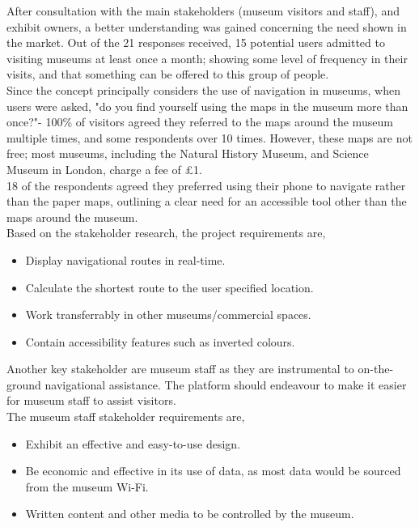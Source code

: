 
After consultation with the main stakeholders (museum visitors and staff), and exhibit owners, a better understanding was gained concerning the need shown in the market. Out of the 21 responses received, 15 potential users admitted to visiting museums at least once a month; showing some level of frequency in their visits, and that something can be offered to this group of people.\\

Since the concept principally considers the use of navigation in museums, when users were asked, "do you find yourself using the maps in the museum more than once?"- 100\% of visitors agreed they referred to the maps around the museum multiple times, and some respondents over 10 times. However, these maps are not free; most museums, including the Natural History Museum, and Science Museum in London, charge a fee of £1.\\

18 of the respondents agreed they preferred using their phone to navigate rather than the paper maps, outlining a clear need for an accessible tool other than the maps around the museum.\\

Based on the stakeholder research, the project requirements are, 
\begin{itemize}
    \item Display navigational routes in real-time.
    \item Calculate the shortest route to the user specified location.
    \item Work transferrably in other museums/commercial spaces.
    \item Contain accessibility features such as inverted colours.
\end{itemize}

Another key stakeholder are museum staff as they are instrumental to on-the-ground navigational assistance. The platform should endeavour to make it easier for museum staff to assist visitors.\\

The museum staff stakeholder requirements are,
\begin{itemize}
    \item Exhibit an effective and easy-to-use design. 
    \item Be economic and effective in its use of data, as most data would be sourced from the museum Wi-Fi. 
    \item Written content and other media to be controlled by the museum.
\end{itemize}

